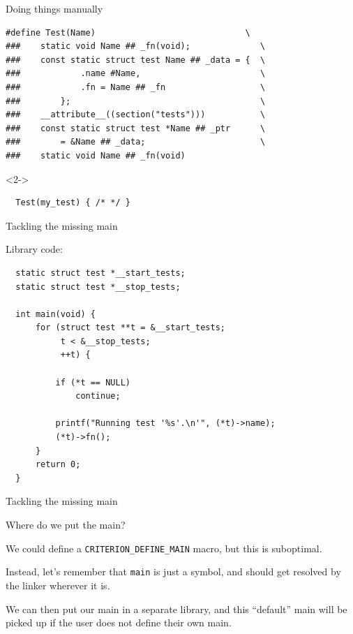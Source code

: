 \documentclass[10pt]{beamer}
\begin{document}
\begin{frame}[fragile]{Doing things manually}

  \begin{lstlisting}
#define Test(Name)                              \
###    static void Name ## _fn(void);              \
###    const static struct test Name ## _data = {  \
###            .name #Name,                        \
###            .fn = Name ## _fn                   \
###        };                                      \
###    __attribute__((section("tests")))           \
###    const static struct test *Name ## _ptr      \
###        = &Name ## _data;                       \
###    static void Name ## _fn(void)
  \end{lstlisting}

  \begin{onlyenv}<2->
  \begin{lstlisting}
  Test(my_test) { /* */ }
  \end{lstlisting}
  \end{onlyenv}
\end{frame}

\begin{frame}[fragile]{Tackling the missing main}

  Library code:
  \begin{lstlisting}
  static struct test *__start_tests;
  static struct test *__stop_tests;

  int main(void) {
      for (struct test **t = &__start_tests;
           t < &__stop_tests;
           ++t) {

          if (*t == NULL)
              continue;

          printf("Running test '%s'.\n'", (*t)->name);
          (*t)->fn();
      }
      return 0;
  }
  \end{lstlisting}

\end{frame}

\begin{frame}[fragile]{Tackling the missing main}

  Where do we put the main? \pause{}

  We could define a \verb|CRITERION_DEFINE_MAIN| macro, but this is suboptimal.

  Instead, let's remember that \verb|main| is just a symbol, and should get
  resolved by the linker wherever it is.

  \pause{}

  We can then put our main in a separate library, and this ``default'' main will
  be picked up if the user does not define their own main.

\end{frame}
\end{document}
